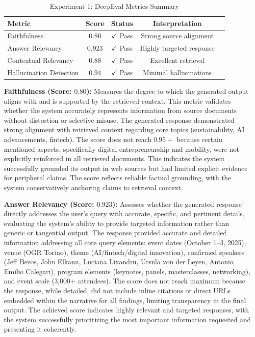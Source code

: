 \begin{table}[h]
  \centering
  \caption{Experiment 1: DeepEval Metrics Summary}
  \begin{tabular}{lcccl}
    \toprule
    \textbf{Metric}         & \textbf{Score} & \textbf{Status}       & \textbf{Interpretation}  \\
    \midrule
    Faithfulness            & \( 0.80 \)     & \( \checkmark \) Pass & Strong source alignment  \\
    Answer Relevancy        & \( 0.923 \)    & \( \checkmark \) Pass & Highly targeted response \\
    Contextual Relevancy    & \( 0.88 \)     & \( \checkmark \) Pass & Excellent retrieval      \\
    Hallucination Detection & \( 0.94 \)     & \( \checkmark \) Pass & Minimal hallucinations   \\
    \bottomrule
  \end{tabular}
\end{table}

\textbf{Faithfulness (Score: \( 0.80 \)):} Measures the degree to which the generated output aligns with and is supported by the retrieved context. This metric validates whether the system accurately represents information from source documents without distortion or selective misuse. The generated response demonstrated strong alignment with retrieved context regarding core topics (sustainability, AI advancements, fintech). The score does not reach \( 0.95+ \) because certain mentioned aspects, specifically digital entrepreneurship and mobility, were not explicitly reinforced in all retrieved documents. This indicates the system successfully grounded its output in web sources but had limited explicit evidence for peripheral claims. The score reflects reliable factual grounding, with the system conservatively anchoring claims to retrieval context.

\textbf{Answer Relevancy (Score: \( 0.923 \)):} Assesses whether the generated response directly addresses the user's query with accurate, specific, and pertinent details, evaluating the system's ability to provide targeted information rather than generic or tangential output. The response provided accurate and detailed information addressing all core query elements: event dates (October 1--3, 2025), venue (OGR Torino), theme (AI/fintech/digital innovation), confirmed speakers (Jeff Bezos, John Elkann, Luciana Lixandru, Ursula von der Leyen, Antonio Emilio Calegari), program elements (keynotes, panels, masterclasses, networking), and event scale (3,000+ attendees). The score does not reach maximum because the response, while detailed, did not include inline citations or direct URLs embedded within the narrative for all findings, limiting transparency in the final output. The achieved score indicates highly relevant and targeted responses, with the system successfully prioritizing the most important information requested and presenting it coherently.

